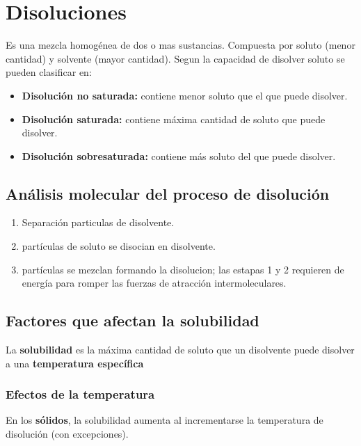 \documentclass[]{article}
\begin{document}
\section{Disoluciones}
Es una mezcla homogénea de dos o mas sustancias. Compuesta por soluto (menor cantidad) y solvente (mayor cantidad). Segun la capacidad de disolver soluto se pueden clasificar en:

\begin{itemize}
	\item \textbf{Disolución no saturada:} contiene menor soluto que el que puede disolver.
	\item \textbf{Disolución saturada:} contiene máxima cantidad de soluto que puede disolver.
	\item \textbf{Disolución sobresaturada:} contiene más soluto del que puede disolver.
\end{itemize}



\subsection{Análisis molecular del proceso de disolución}
\begin{enumerate}
	\item Separación particulas de disolvente.
	\item partículas de soluto se disocian en disolvente.
	\item partículas se mezclan formando la disolucion; las estapas 1 y 2 requieren de energía para romper las fuerzas de atracción intermoleculares.
\end{enumerate}


\subsection{Factores que afectan la solubilidad}
La \textbf{solubilidad} es la máxima cantidad de soluto que un disolvente puede disolver a una \textbf{temperatura específica}



\subsubsection{Efectos de la temperatura}
En los \textbf{sólidos}, la solubilidad aumenta al incrementarse la temperatura de disolución (con excepciones). 
 
\end{document}
